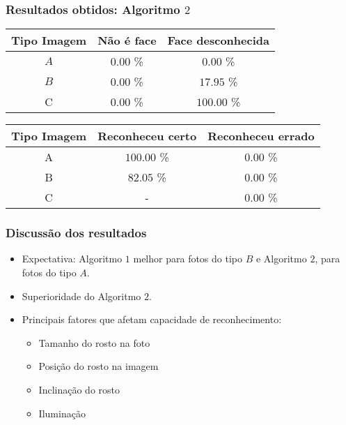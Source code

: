 \documentclass[15pt]{beamer}
\begin{document}
\begin{frame}
    \frametitle{Resultados obtidos: Algoritmo \( 2 \)}
    \begin{table}
        \begin{tabular}{ |c|c|c| }
            \hline
            Tipo Imagem & Não é face & Face desconhecida \\
            \hline
            \( A \) & \( 0.00 \) \% & \( 0.00 \) \% \\
            \hline
            \( B \) & \( 0.00 \) \% & \( 17.95 \) \% \\
            \hline
            C & \( 0.00 \) \% & \( 100.00 \) \% \\
            \hline
        \end{tabular}
    \end{table}

    \begin{table}
        \begin{tabular}{|c|c|c|}
            \hline
            Tipo Imagem & Reconheceu certo & Reconheceu errado \\
            \hline
            A & \( 100.00 \) \% & \( 0.00 \) \% \\
            \hline
            B & \( 82.05 \) \% & \( 0.00 \) \% \\
            \hline
            C & - & \( 0.00 \) \% \\
            \hline
        \end{tabular}
    \end{table}
\end{frame}

\begin{frame}
    \frametitle{Discussão dos resultados}

    \begin{itemize}
        \item<1-> Expectativa: Algoritmo \( 1 \) melhor para fotos do tipo \( B \) e Algoritmo \( 2 \), para fotos do tipo \( A \).
        \item<2-> Superioridade do Algoritmo \( 2 \).
        \item<3-> Principais fatores que afetam capacidade de reconhecimento:
            \begin{itemize}
                \item Tamanho do rosto na foto
                \item Posição do rosto na imagem
                \item Inclinação do rosto
                \item Iluminação
            \end{itemize}
    \end{itemize}

\end{frame}
\end{document}
